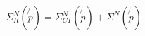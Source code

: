 \begin{equation}
\Sigma _{R}^{N}(\not{p})=\Sigma _{CT}^{N}(\not{p})+\Sigma ^{N}(\not{p})
\end{equation}

